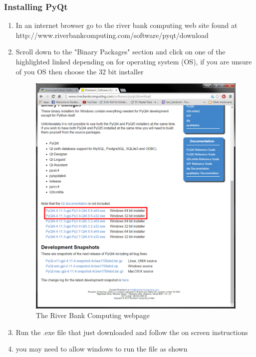 \subsubsection{Installing PyQt}
\begin{enumerate}
\item In an internet browser go to the river bank computing web site found at http://www.riverbankcomputing.com/software/pyqt/download
\item Scroll down to the "Binary Packages" section and click on one of the highlighted linked depending on for operating system (OS), if you are unsure of you OS then choose the 32 bit installer
\begin{figure}[H]
\includegraphics[width=\textwidth]{./Manual/PyQtInstall/Part1.png}
\caption{The River Bank Computing webpage} \label{fig:PyQtISP1}
\end{figure}
\item Run the .exe file that just downloaded and follow the on screen instructions
\item you may need to allow windows to run the file as shown
\begin{figure}[H]

\end{figure}
\end{enumerate}
